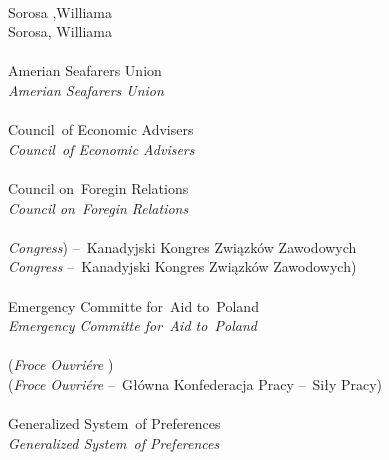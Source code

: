 \documentclass[a4paper,11pt]{article}
\begin{document}
\begin{center}
\begin{tabular}{|c|c|c|c|c|}
    \hline
  \end{tabular}
\end{center}
\noi
{} \\
\Jest Sorosa ,Williama \\
\Pow Sorosa, Williama \\
 \\
\Jest Amerian Seafarers Union \\
\Pow  \emph{Amerian Seafarers Union} \\
 \\
\Jest Council~of Economic Advisers \\
\Pow  \emph{Council~of Economic Advisers} \\
 \\
\Jest Council on~Foregin Relations \\
\Pow  \emph{Council on~Foregin Relations} \\
 \\
\Jest \emph{Congress}) --~Kanadyjski Kongres Związków Zawodowych \\
\Pow  \emph{Congress} --~Kanadyjski Kongres Związków Zawodowych) \\
 \\
\Jest Emergency Committe for~Aid to~Poland \\
\Pow  \emph{Emergency Committe for~Aid to~Poland} \\
 \\
\Jest (\emph{Froce Ouvri\'{e}re} ) \\
\Pow (\emph{Froce Ouvri\'{e}re} --~Główna Konfederacja Pracy --~Siły
Pracy) \\
 \\
\Jest Generalized System~of Preferences \\
\Pow  \emph{Generalized System~of Preferences} \\
\end{document}
